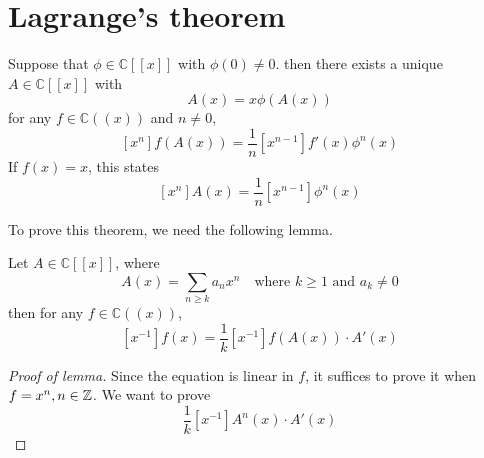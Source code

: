 \section{Lagrange's theorem}
\begin{theorem}
Suppose that \(\phi\in\mathbb{C}[[x]]\) with \(\phi(0)\neq0\).
then there exists a unique \(A\in\mathbb{C}[[x]]\) with
\[ A(x)=x\phi(A(x)) \]
for any \(f\in\mathbb{C}((x))\) and \(n\neq0\),
\[ \left[x^n\right]f(A(x))=\frac{1}{n}\left[x^{n-1}\right]f'(x)\phi^n(x) \]
If \(f(x)=x\), this states
\[ \left[x^n\right]A(x)=\frac{1}{n}\left[x^{n-1}\right]\phi^n(x) \]
\end{theorem}

To prove this theorem, we need the following lemma.
\begin{lemma}
Let \(A\in\mathbb{C}[[x]]\), where
\[ A(x)=\sum_{n\geq k}a_n x^n \quad \text{where } k\geq1 \text{ and } a_k\neq0 \]
then for any \(f\in\mathbb{C}((x))\),
\[ \left[x^{-1}\right]f(x)=\frac{1}{k}\left[x^{-1}\right]f(A(x))\cdot A'(x) \]
\end{lemma}
\begin{proof}[Proof of lemma]
Since the equation is linear in \(f\), it suffices to prove it when \(f=x^n,n\in\mathbb{Z}\).
We want to prove
\[ \frac{1}{k}\left[x^{-1}\right]A^n(x)\cdot A'(x) \]
\end{proof}